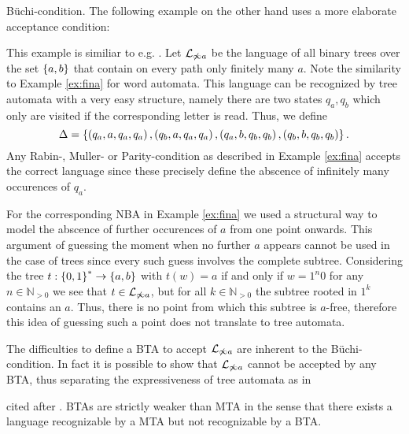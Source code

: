 Büchi-condition. The following example on the other hand uses a more elaborate
acceptance condition:
\begin{example}
  This example is similiar to e.g.
  \cite[Exercise 8.3 and the proof of Theorem 8.6]{AutoLogInfGames}.
  Let $\mathcal{L}_{\not\infty a}$ be the language of all binary trees over the
  set $\left\{a,b\right\}$ that contain on every path only finitely many $a$. Note the
  similarity to Example \ref{ex:fina} for word automata. This
  language can be recognized by tree automata with a very easy structure,
  namely there are two states $q_{a}, q_{b}$ which only are visited if the
  corresponding letter is read. Thus, we define
  \begin{equation*}
    \Delta = \left\{
      \left(q_{a}, a, q_{a}, q_{a}\right),
      \left(q_{b}, a, q_{a}, q_{a}\right),
      \left(q_{a}, b, q_{b}, q_{b}\right),
      \left(q_{b}, b, q_{b}, q_{b}\right)
    \right\}.
  \end{equation*}
  Any Rabin-, Muller- or Parity-condition as described in Example \ref{ex:fina}
  accepts the correct language since these precisely define the abscence of
  infinitely many occurences of $q_{a}$.

  For the corresponding \ac{NBA} in Example \ref{ex:fina} we used a structural
  way to model the abscence of further occurences of $a$ from one point 
  onwards.  This argument of guessing the moment when no further $a$ appears 
  cannot be used in the case of trees since every such guess involves the 
  complete subtree. Considering the tree $t:\left\{0,1\right\}^{*}\rightarrow\left\{a,b\right\}$ 
  with $t(w) = a$ if and only if $w = 1^{n}0$ for any $n\in\mathbb{N}_{>0}$ we 
  see that $t\in\mathcal{L}_{\not\infty a}$, but for all $k\in\mathbb{N}_{>0}$ 
  the subtree rooted in $1^{k}$ contains an $a$. Thus, there is no point from
  which this subtree is $a$-free, therefore this idea of guessing such a point 
  does not translate to tree automata.
\end{example}
The difficulties to define a \ac{BTA} to accept $\mathcal{L}_{\not\infty a}$ 
are inherent to the Büchi-condition. In fact it is possible to show that 
$\mathcal{L}_{\not\infty a}$ cannot be accepted by any \ac{BTA}, thus 
separating the expressiveness of tree automata as in
\begin{theorem}
  \cite[Corollary 8]{WeakDefRel} cited after
  \cite[Theorem 8.6]{AutoLogInfGames}.
  \acp{BTA} are strictly weaker than \ac{MTA} in the sense that there exists 
  a language recognizable by a \ac{MTA} but not recognizable by a \ac{BTA}.
\end{theorem}
